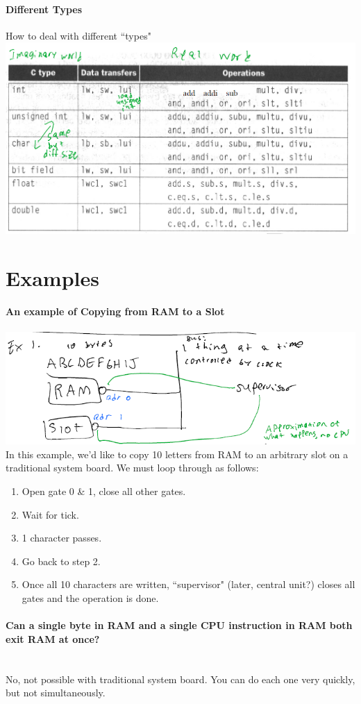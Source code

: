 \documentclass[12 pt]{article}
\begin{document}
\paragraph{Different Types} How to deal with different ``types" \\ \includegraphics[scale=0.7]{typ}
\section{Examples}
	\paragraph{An example of Copying from RAM to a Slot}
	\includegraphics[scale=0.5]{rmstr.png}
	In this example, we'd like to copy 10 letters from RAM to an arbitrary slot on a traditional system board. We must loop through as follows:
	\begin{enumerate}
		\item Open gate 0 \& 1, close all other gates.
		\item Wait for tick.
		\item 1 character passes.
		\item Go back to step 2.
		\item Once all 10 characters are written, ``supervisor" (later, central unit?) closes all gates and the operation is done.
		\end{enumerate}
		\paragraph{Can a single byte in RAM and a single CPU instruction in RAM both exit RAM at once?}
		~\\ No, not possible with traditional system board. You can do each one very quickly, but not simultaneously.
\end{document}
